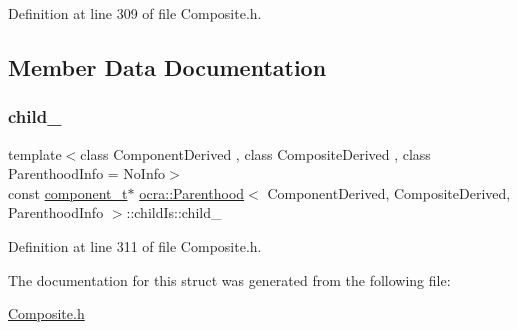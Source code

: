 Definition at line 309 of file Composite.\+h.



\subsection{Member Data Documentation}
\hypertarget{structocra_1_1Parenthood_1_1childIs_a6e3329ea395bbb40d41caceecb1587b7}{}\label{structocra_1_1Parenthood_1_1childIs_a6e3329ea395bbb40d41caceecb1587b7} 
\subsubsection{\texorpdfstring{child\+\_\+}{child\_}}
{\footnotesize\ttfamily template$<$class Component\+Derived , class Composite\+Derived , class Parenthood\+Info  = No\+Info$>$ \\
const \hyperlink{classocra_1_1Parenthood_a44b601577125fe0fd1d1e5ae4f143349}{component\+\_\+t}$\ast$ \hyperlink{classocra_1_1Parenthood}{ocra\+::\+Parenthood}$<$ Component\+Derived, Composite\+Derived, Parenthood\+Info $>$\+::child\+Is\+::child\+\_\+}



Definition at line 311 of file Composite.\+h.



The documentation for this struct was generated from the following file\+:\begin{DoxyCompactItemize}
\item 
\hyperlink{Composite_8h}{Composite.\+h}\end{DoxyCompactItemize}
